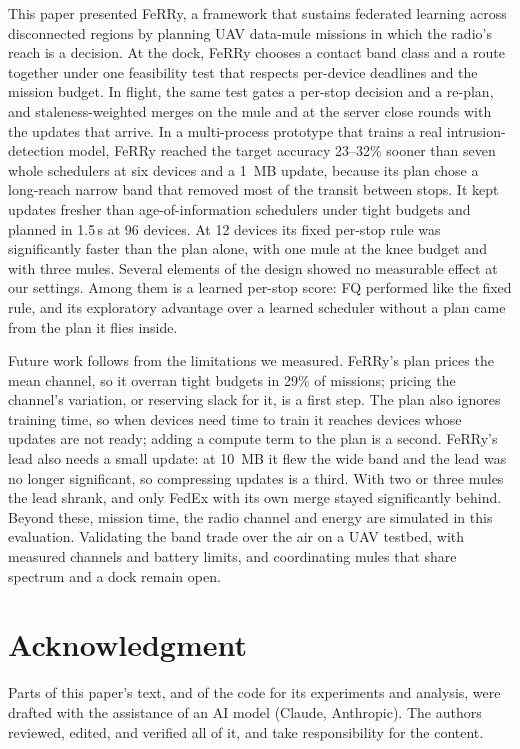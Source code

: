 \documentclass[conference]{IEEEtran}
\newcommand{\sysname}{FeRRy}
\begin{document}
This paper presented \sysname{}, a framework that sustains federated learning
across disconnected regions by planning UAV data-mule missions in which the
radio's reach is a decision. At the dock, \sysname{} chooses a contact band
class and a route together under one feasibility test that respects per-device
deadlines and the mission budget. In flight, the same test gates a per-stop
decision and a re-plan, and staleness-weighted merges on the mule and at the
server close rounds with the updates that arrive. In a multi-process prototype
that trains a real intrusion-detection model, \sysname{} reached the target
accuracy 23--32\% sooner than seven whole schedulers at six devices and a 1~MB
update, because its
plan chose a long-reach narrow band that removed most of the transit between
stops. It kept updates fresher than age-of-information schedulers under tight
budgets and planned in 1.5\,s at 96 devices. At 12 devices its fixed per-stop rule
was significantly faster than the plan alone, with one mule at the knee budget and
with three mules. Several elements of the design showed no measurable
effect at our settings. Among them is a learned per-stop score: FQ performed like
the fixed rule, and its exploratory advantage over a learned scheduler without a
plan came from the plan it flies inside.

Future work follows from the limitations we measured. \sysname{}'s plan prices
the mean channel, so it overran tight budgets in 29\% of missions; pricing the
channel's variation, or reserving slack for it, is a first step. The plan also
ignores training time, so when devices need time to train it reaches devices
whose updates are not ready; adding a compute term to the plan is a second.
\sysname{}'s lead also needs a small update: at 10~MB it flew the wide band and the lead was
no longer significant, so compressing updates is a third. With two or three mules
the lead shrank, and only FedEx with its own merge stayed significantly behind.
Beyond these, mission time, the radio channel and energy are simulated in this
evaluation. Validating the band trade over the air on a UAV testbed, with
measured channels and battery limits, and coordinating mules that share
spectrum and a dock remain open.

\section*{Acknowledgment}
Parts of this paper's text, and of the code for its experiments and analysis,
were drafted with the assistance of an AI model (Claude, Anthropic). The authors
reviewed, edited, and verified all of it, and take responsibility for the
content.



\end{document}
